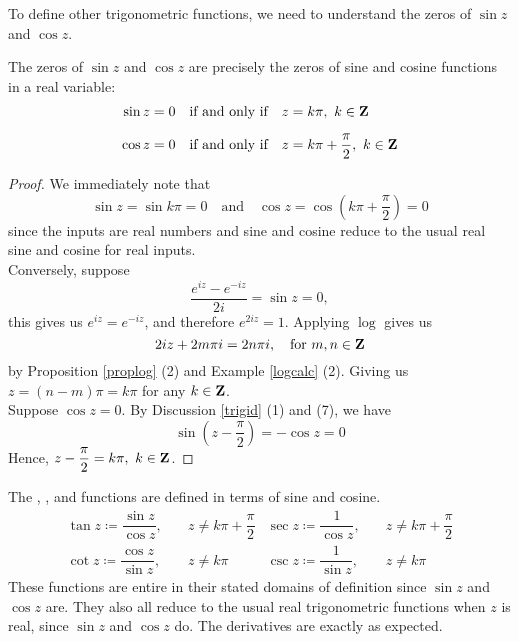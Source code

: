 \vspace*{1em}

To define other trigonometric functions, we need to understand the zeros of $\sin z$ and $\cos z$.
\begin{theorem}
The zeros of $\sin z$ and $\cos z$ are precisely the zeros of sine and cosine functions in a real variable:
\begin{align*}
\sin z = 0 \quad \text{if and only if} &\quad z = k\pi,\ k \in \mathbf Z\\[0.5em]
\cos z = 0 \quad \text{if and only if} &\quad z = k\pi + \dfrac{\pi}{2},\ k \in \mathbf Z
\end{align*}
\end{theorem}
\begin{proof}
We immediately note that
\[\sin z = \sin k\pi = 0 \quad \text{and} \quad \cos z = \cos\left(k\pi + \dfrac{\pi}{2}\right) = 0\]
since the inputs are real numbers and sine and cosine reduce to the usual real sine and cosine for real inputs.\\[1em]
Conversely, suppose
\[\frac{e^{iz} - e^{-iz}}{2i} = \sin z = 0,\]
this gives us $e^{iz} = e^{-iz}$, and therefore $e^{2iz} = 1$. Applying $\log$ gives us
\[2iz + 2m\pi i = 2n\pi i,\quad \text{for } m,n \in \mathbf Z\]
by Proposition \ref{proplog} (2) and Example \ref{logcalc} (2). Giving us $z = (n-m)\pi = k\pi$ for any $k\in \mathbf Z$.\\[1em]
Suppose $\cos z = 0$. By Discussion \ref{trigid} (1) and (7), we have
\[\sin\left(z - \frac{\pi}{2}\right) = -\cos z = 0\]
Hence, $z - \dfrac{\pi}{2} = k\pi,\ k \in \mathbf Z$.
\end{proof}

\vspace*{1em}

\begin{definition}
The , ,  and  functions are defined in terms of sine and cosine.
\begin{align*}
\tan z \coloneqq \dfrac{\sin z}{\cos z},&\quad z \neq k\pi + \dfrac{\pi}{2} & \sec z \coloneqq \dfrac{1}{\cos z},&\quad z \neq k\pi + \dfrac{\pi}{2}\\[1em]
\cot z \coloneqq \dfrac{\cos z}{\sin z},&\quad z \neq k\pi & \csc z \coloneqq \dfrac{1}{\sin z},&\quad z \neq k\pi
\end{align*}
These functions are entire in their stated domains of definition since $\sin z$ and $\cos z$ are. They also all reduce to the usual real trigonometric functions when $z$ is real, since $\sin z$ and $\cos z$ do. The derivatives are exactly as expected.
\end{definition}

